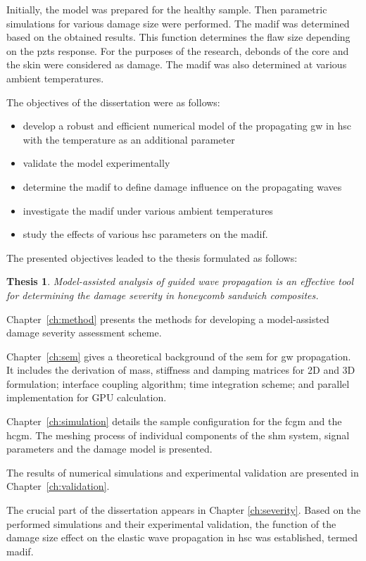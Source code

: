 \documentclass[11pt,a4paper,final]{report}
\newtheorem*{thesis*}{Thesis}
\theoremstyle{plain}
\begin{document}
Initially, the model was prepared for the healthy sample.
Then parametric simulations for various damage size were performed.
The \ac{madif} was determined based on the obtained results. 
This function determines the flaw size depending on the \acp{pzt} response.
For the purposes of the research, debonds of the core and the skin were considered as damage.
The \ac{madif} was also determined at various ambient temperatures.

The objectives of the dissertation were as follows:
\begin{itemize}
	\item develop a robust and efficient numerical model of the propagating \ac{gw} in \ac{hsc} with the temperature as an additional parameter
	\item validate the model experimentally
	\item determine the \ac{madif} to define damage influence on the propagating waves
	\item investigate the \ac{madif} under various ambient temperatures
	\item study the effects of various \ac{hsc} parameters on the \ac{madif}.
\end{itemize}

The presented objectives leaded to the thesis formulated as follows:
\begin{thesis*}  
	Model-assisted analysis of guided wave propagation is an effective tool for determining the damage severity in honeycomb sandwich composites.
\label{thesis}
\end{thesis*}

Chapter~\ref{ch:method} presents the methods for developing a model-assisted damage severity assessment scheme.

Chapter~\ref{ch:sem} gives a theoretical background of the \ac{sem} for \ac{gw} propagation.
It includes the derivation of mass, stiffness and damping matrices for 2D and 3D formulation; interface coupling algorithm; time integration scheme; and parallel implementation for GPU calculation.

Chapter~\ref{ch:simulation} details the sample configuration for the \ac{fcgm} and the \ac{hcgm}.
The meshing process of individual components of the \ac{shm} system, signal parameters and the damage model is presented.

The results of numerical simulations and experimental validation are presented in Chapter~\ref{ch:validation}.

The crucial part of the dissertation appears in Chapter \ref{ch:severity}.
Based on the performed simulations and their experimental validation, the function of the damage size effect on the elastic wave propagation in \ac{hsc} was established, termed \ac{madif}.
\end{document}
